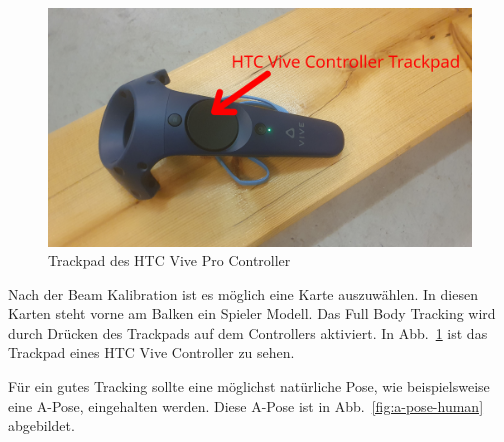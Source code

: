 \begin{figure}
    \centering
    \includegraphics[scale=0.1]{pics/vive_controller_trackpad}
    \caption{Trackpad des HTC Vive Pro Controller}
    \label{fig:vive-controller-trackpad}
\end{figure}



Nach der Beam Kalibration ist es möglich eine Karte auszuwählen.
In diesen Karten steht vorne am Balken ein Spieler Modell.
Das Full Body Tracking wird durch Drücken des Trackpads auf dem Controllers aktiviert.
In Abb.~\ref{fig:vive-controller-trackpad} ist das Trackpad eines HTC Vive Controller zu sehen.

Für ein gutes Tracking sollte eine möglichst natürliche Pose, wie beispielsweise eine A-Pose, eingehalten werden.
Diese A-Pose ist in Abb.~\ref{fig:a-pose-human} abgebildet.


